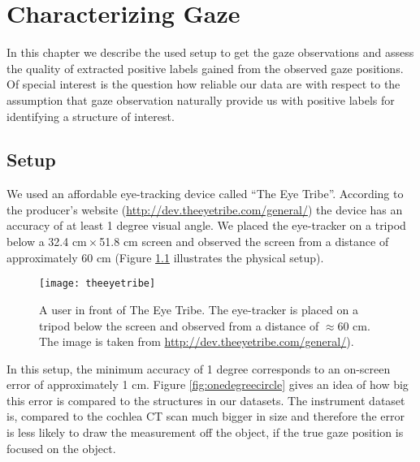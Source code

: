 \chapter{Characterizing Gaze}
\label{chap:characterizing-gaze}
In this chapter we describe the used setup to get the gaze observations and assess the quality of extracted positive labels gained from the observed gaze positions. Of special interest is the question how reliable our data are with respect to the assumption that gaze observation naturally provide us with positive labels for identifying a structure of interest.

\section{Setup}
We used an affordable eye-tracking device called ``The Eye Tribe''. 
According to the producer's website (\url{http://dev.theeyetribe.com/general/}) the device has an accuracy of at least 1 degree visual angle. We placed the eye-tracker on a tripod below a 32.4 cm\,$\times$\,51.8 cm screen and observed the screen from a distance of approximately 60 cm (Figure \ref{fig:theeyetribe} illustrates the physical setup).
\begin{figure}[ht]
	\centering
	\texttt{[image: theeyetribe]}	
	\caption{A user in front of The Eye Tribe. The eye-tracker is placed on a tripod below the screen and observed from a distance of $\approx$60 cm. The image is taken from \url{http://dev.theeyetribe.com/general/}).}
	\label{fig:theeyetribe}
\end{figure}
In this setup, the minimum accuracy of 1 degree corresponds to an on-screen error of approximately 1 cm. 
Figure \ref{fig:onedegreecircle} gives an idea of how big this error is compared to the structures in our datasets. 
The instrument dataset is, compared to the cochlea CT scan much bigger in size and therefore the error is less likely to draw the measurement off the object, if the true gaze position is focused on the object.

